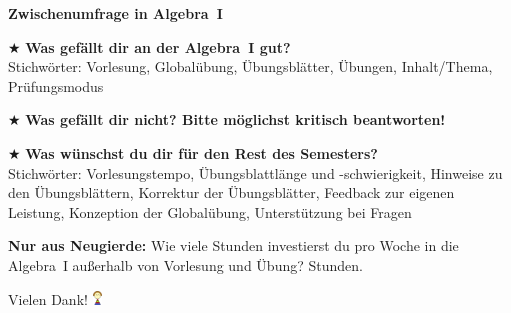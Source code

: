 \documentclass[12pt,a4paper,ngerman]{scrartcl}
\newcommand{\quest}[1]{$\bigstar$ #1 \vfill}
\newcommand{\neugierde}[1]{\textbf{Nur aus Neugierde:} #1}
\begin{document}
\begin{center}\Large\textbf{Zwischenumfrage in Algebra~I}\end{center}

\quest{\textbf{Was gefällt dir an der Algebra~I gut?} \\
Stichwörter: Vorlesung, Globalübung, Übungsblätter, Übungen, Inhalt/Thema,
Prüfungsmodus}

\hrulefill

\quest{\textbf{Was gefällt dir nicht? Bitte möglichst kritisch beantworten!}}

\hrulefill

\quest{\textbf{Was wünschst du dir für den Rest des Semesters?} \\
Stichwörter: Vorlesungstempo, Übungsblattlänge und -schwierigkeit,
Hinweise zu den Übungsblättern, Korrektur der Übungsblätter, Feedback zur
eigenen Leistung, Konzeption der Globalübung, Unterstützung bei Fragen}

\hrulefill

\neugierde{{Wie viele Stunden investierst du pro Woche in die
Algebra~I außerhalb von Vorlesung und Übung?}}
\underline{\quad\qquad} Stunden.


\begin{center}\large Vielen Dank! \includegraphics[height=1em]{smile}
\end{center}
\end{document}
